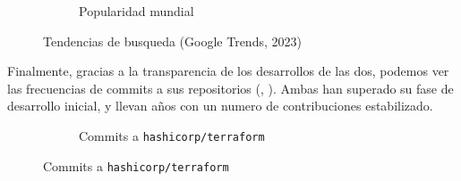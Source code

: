 \documentclass[11pt]{article}
\begin{document}
\begin{flushleft}
     \begin{figure}[htb]
        \ContinuedFloat
        \centering
        \begin{subfigure}{0.95\textwidth}
            \caption{Popularidad mundial}
        \end{subfigure}
        \caption{Tendencias de busqueda (Google Trends, 2023)}
    \end{figure} 

Finalmente, gracias a la transparencia de los desarrollos de las dos, podemos ver las frecuencias de commits a sus repositorios (\cite{git_tf}, \cite{git_ans}). Ambas han superado su fase de desarrollo inicial, y llevan años con un numero de contribuciones estabilizado.
\linebreak

    \begin{figure}[htb]
        \centering
        \begin{subfigure}{0.85\textwidth}
            \caption{Commits a \texttt{hashicorp/terraform}}
        \end{subfigure}
        \linebreak
        \skip
        

\end{figure}
\end{flushleft}
\end{document}
